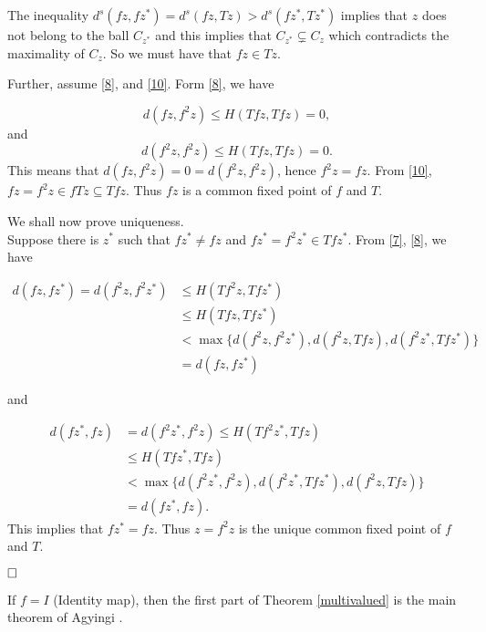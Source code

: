\documentclass[10pt,a4paper]{article}
\begin{document}
{The inequality $d^s(fz,fz^{\ast})=d^s(fz,Tz)>d^s(fz^{\ast},Tz^{\ast})$ implies that $z$ does not belong to the ball $C_{z^{\ast}}$ and this implies that $C_{z^{\ast}} \subsetneq C_z$ which contradicts the maximality of $C_z$. So we must have that $fz\in Tz$.


Further, assume \eqref{8}, and \eqref{10}. Form \eqref{8}, we have

\[
d(fz,f^2z)\leq H(Tfz,Tfz)= 0, 
\]
and 
\[
d(f^2z,f^2z) \leq H(Tfz,Tfz)= 0.
\]
This means that $d(fz,f^2z)=0=d(f^2z,f^2z)$, hence $f^2z=fz$.
From \eqref{10}, $fz=f^2z \in fTz \subseteq Tfz$. Thus $fz$ is a common fixed point of $f$ and $T$.

We shall now prove uniqueness.\\
Suppose there is $z^*$ such that $fz^*\neq fz$ and $fz^*=f^2z^* \in Tfz^*$. From \eqref{7}, \eqref{8}, we have

\begin{align*}
 d(fz,fz^*)=d(f^2z,f^2z^*) &\leq H(Tf^2z,Tfz^*)\\
            &\leq H(Tfz,Tfz^*) \\
            & < \max \{ d(f^2z,f^2z^*),d(f^2z,Tfz),d(f^2z^*,Tfz^*)\} \\
            & = d(fz,fz^*)
\end{align*}

and 

\begin{align*}
 d(fz^*,fz)&=d(f^2z^*,f^2z) \leq H(Tf^2z^*,Tfz)\\
            &\leq H(Tfz^*,Tfz) \\
            & < \max \{ d(f^2z^*,f^2z),d(f^2z^*,Tfz^*),d(f^2z,Tfz)\} \\
            & = d(fz^*,fz).
\end{align*}
This implies that $fz^*= fz$. Thus $z=f^2z$ is the unique common fixed point of $f$ and $T$.

$\hfill{\Box}$

\remark If $f=I$ (Identity map), then the first part of Theorem \ref{multivalued} is the main theorem of Agyingi \cite{Agyingiproximity}.}
\end{document}
